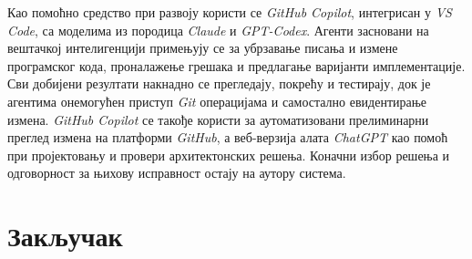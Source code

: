 \documentclass[12pt,oneside]{memoir}
\begin{document}
Као помоћно средство при развоју користи се \textit{GitHub Copilot}, интегрисан у \textit{VS Code}, са моделима из породица \textit{Claude} и \textit{GPT-Codex}. Агенти засновани на вештачкој интелигенцији примењују се за убрзавање писања и измене програмског кода, проналажење грешака и предлагање варијанти имплементације. Сви добијени резултати накнадно се прегледају, покрећу и тестирају, док је агентима онемогућен приступ \textit{Git} операцијама и самостално евидентирање измена. \textit{GitHub Copilot} се такође користи за аутоматизовани прелиминарни преглед измена на платформи \textit{GitHub}, а веб-верзија алата \textit{ChatGPT} као помоћ при пројектовању и провери архитектонских решења. Коначни избор решења и одговорност за њихову исправност остају на аутору система.


\chapter{Закључак}

\literatura

\backmatter

\begin{biografija}

\end{biografija}
\end{document}
